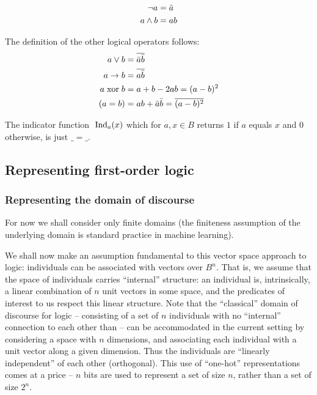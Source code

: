 \documentclass{article} %
\begin{document}
\begin{align*}
  \neg a &= \bar{a}\\
  a \wedge b &= a b
\end{align*}

The definition of the other logical operators follows:
  \begin{align*}
  a\vee b &= \overline{\bar{a}\bar{b}} \\
  a \rightarrow b &= \overline{a\bar{b}}\\
  a \;\mbox{xor}\; b &= a + b - 2ab=(a-b)^2\\
  (a = b) &=a b + \bar{a}\bar{b} =\overline{(a-b)^2}
  \end{align*}

The indicator function $\;\mbox{Ind}_a(x)$ which for $a,x \in B$ returns
$1$ if $a$ equals $x$ and $0$ otherwise, is just $\_=\_$.

\subsection{Representing first-order logic}

\subsubsection{Representing the domain of discourse}
For now we shall consider only finite domains (the finiteness assumption of the underlying domain is standard practice in machine learning).

We shall now make an assumption fundamental to this vector space approach to logic: individuals can be associated with vectors over \(B^n\). That is, we assume that the space of individuals carries ``internal'' structure: an individual is, intrinsically, a linear combination of \(n\) unit vectors in some space, and the predicates of interest to us respect this linear structure. Note that the ``classical'' domain of discourse for logic -- consisting of a set of \(n\) individuals with no ``internal'' connection to each other than -- can be accommodated in the current setting by considering a space with \(n\) dimensions, and associating each individual with a unit vector along a given dimension. Thus the individuals are ``linearly independent'' of each other (orthogonal). This use of ``one-hot'' representations comes at a price -- $n$ bits are used to represent a set of size \(n\), rather than a set of size \(2^n\). %
\end{document}
